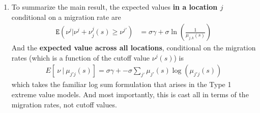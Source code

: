 \documentclass[pdftex,11pt]{article}
\begin{document}
\begin{enumerate}
\item To summarize the main result, the expected values \textbf{in a location $j$} conditional on a migration rate are
\begin{align}
\mathtt{E}(\nu^{j} | \nu^{j} + \nu_{j}^{j}(s) \geq \nu^{j'}) &= \sigma \gamma + \sigma \ln \left( \frac{1}{\mu_{j,k}(s)} \right)
\end{align}
And the \textbf{expected value across all locations}, conditional on the migration rates (which is a function of the cutoff value $\nu^{j}(s)$) is
\begin{align}
E[\ \nu \ | \ \mu_{j'j}(s)] = \sigma \gamma + -\sigma \sum_{j'} \mu_{j'}(s) \log \left( \mu_{j'j}(s) \right)
\end{align}
which takes the familiar log sum formulation that arises in the Type 1 extreme value models. And most importantly, this is cast all in terms of the migration rates, not cutoff values.
\end{enumerate}
%
%
%
%
%
%
%
%
%
%
%
\end{document}
